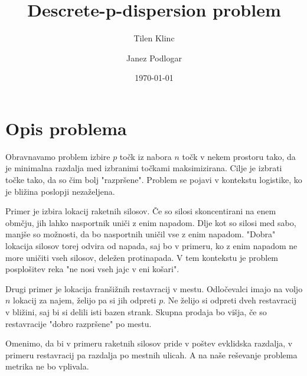 \documentclass{amsart}
\title{Descrete-p-dispersion problem}
\author{Tilen Klinc}
\author{Janez Podlogar}
\date{\today}
\begin{document}
    
\maketitle

\section{Opis problema}

Obravnavamo problem izbire $ p $ točk iz nabora $ n $ točk v nekem prostoru
tako, da je minimalna razdalja med izbranimi točkami maksimizirana. Cilje je
izbrati točke tako, da so čim bolj "razpršene". Problem se pojavi v kontekstu
logistike, ko je bližina poslopji nezaželjena.


Primer je izbira lokacij raketnih silosov. Če so silosi skoncentirani na enem
obmčju, jih lahko nasportnik uniči z enim napadom. Dlje kot so silosi med sabo,
manjše so možnosti, da bo nasportnih uničil vse z enim napadom. "Dobra" lokacija
silosov torej odvira od napada, saj bo v primeru, ko z enim napadom ne more uničiti
vseh silosov, deležen protinapada. V tem kontekstu je problem posplošitev reka 
"ne nosi vseh jajc v eni košari".

Drugi primer je lokacija franšižnih restavracij v mestu. Odločevalci imajo na voljo $ n $
lokacij za najem, želijo pa si jih odpreti $ p $. Ne želijo si odpreti dveh restavracij
v bližini, saj bi si delili isti bazen strank. Skupna prodaja bo višja, če so restavracije
"dobro razpršene" po mestu.

Omenimo, da bi v primeru raketnih silosov pride v poštev evklidska razdalja, v primeru
restavracij pa razdalja po mestnih ulicah. A na naše reševanje problema metrika ne bo 
vplivala.
\end{document}

